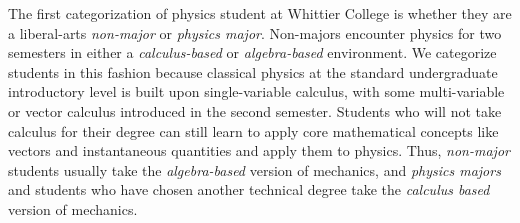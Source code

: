 \documentclass[../../main.tex]{subfiles}
\begin{document}
The first categorization of physics student at Whittier College is whether they are a liberal-arts \textit{non-major} or \textit{physics major}.  Non-majors encounter physics for two semesters in either a \textit{calculus-based} or \textit{algebra-based} environment.  We categorize students in this fashion because classical physics at the standard undergraduate introductory level is built upon single-variable calculus, with some multi-variable or vector calculus introduced in the second semester.  Students who will not take calculus for their degree can still learn to apply core mathematical concepts like vectors and instantaneous quantities and apply them to physics.  Thus, \textit{non-major} students usually take the \textit{algebra-based} version of mechanics, and \textit{physics majors} and students who have chosen another technical degree take the \textit{calculus based} version of mechanics.  \\ \hspace{0.1cm}
\end{document}
